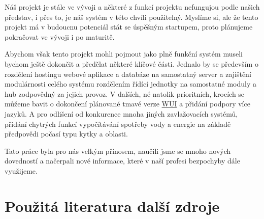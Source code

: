 \documentclass[12pt,a4paper]{article}
\begin{document}
Náš projekt je stále ve vývoji a některé z funkcí projektu nefungujou podle našich představ, i přes to, je náš systém v této chvíli použitelný. Myslíme si, ale že tento projekt má v budoucnu potenciál stát se úspěšným startupem, proto plánujeme pokračovat ve vývoji i po maturitě. 

Abychom však tento projekt mohli pojmout jako plně funkční systém museli bychom ještě dokončit a předělat některé klíčové části. Jednalo by se především o rozdělení hostingu webové aplikace a databáze na samostatný server a zajištění modulárnosti celého systému rozdělením řídící jednotky na samostatné moduly a hub zodpovědný za jejich provoz. V dalších, né natolik prioritních, krocích se můžeme bavit o dokončení plánované tmavé verze \underline{\ac{WUI}} a přidání podpory více jazyků. A pro odlišení od konkurence mnoha jiných zavlažovacích systémů, přidání chytrých funkcí vypočítávání spotřeby vody a energie na základě předpovědi počasí typu kytky a oblasti. 

Tato práce byla pro nás velkým přínosem, naučili jsme se mnoho nových dovedností a načerpali nové informace, které v naší profesi bezpochyby dále využijeme.

\clearpage

\section{Použitá literatura další zdroje }
\end{document}

